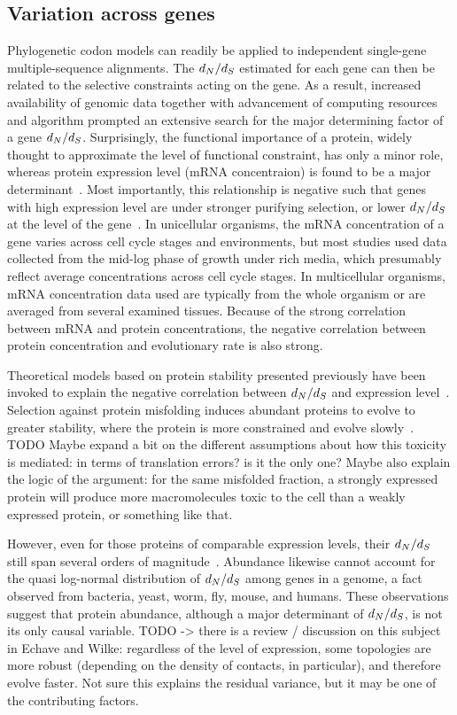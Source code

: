 \subsection{Variation across genes}

Phylogenetic codon models can readily be applied to independent single-gene multiple-sequence alignments.
The $d_N / d_S$ estimated for each gene can then be related to the selective constraints acting on the gene.
As a result, increased availability of genomic data together with advancement of computing resources and algorithm prompted an extensive search for the major determining factor of a gene $d_N / d_S$.
Surprisingly, the functional importance of a protein, widely thought to approximate the level of functional constraint, has only a minor role, whereas protein expression level (mRNA concentraion) is found to be a major determinant~\citep{Zhang2015}.
Most importantly, this relationship is negative such that genes with high expression level are under stronger purifying selection, or lower $d_N / d_S$ at the level of the gene~\citep{Duret2000, Drummond2005a, Zhang2015}.
In unicellular organisms, the mRNA concentration of a gene varies across cell cycle stages and environments, but most studies used data collected from the mid-log phase of growth under rich media, which presumably reflect average concentrations across cell cycle stages.
In multicellular organisms, mRNA concentration data used are typically from the whole organism or are averaged from several examined tissues.
Because of the strong correlation between mRNA and protein concentrations, the negative correlation between protein concentration and evolutionary rate is also strong.

Theoretical models based on protein stability presented previously have been invoked to explain the negative correlation between $d_N / d_S$ and expression level~\citep{Wilke2006, Drummond2008}.
Selection against protein misfolding induces abundant proteins to evolve to greater stability, where the protein is more constrained and evolve slowly~\citep{Serohijos2012}.
TODO
Maybe expand a bit on the different assumptions about how this toxicity is mediated:
in terms of translation errors? is it the only one?
Maybe also explain the logic of the argument: for the same misfolded fraction, a strongly expressed protein will produce more macromolecules toxic to the cell than a weakly expressed protein, or something like that.


However, even for those proteins of comparable expression levels, their $d_N / d_S$ still span several orders of magnitude~\citep{Drummond2008}.
Abundance likewise cannot account for the quasi log-normal distribution of $d_N / d_S$ among genes in a genome, a fact observed from bacteria, yeast, worm, fly, mouse, and humans.
These observations suggest that protein abundance, although a major determinant of $d_N / d_S$, is not its only causal variable.
TODO
-> there is a review / discussion on this subject in Echave and Wilke: regardless of the level of expression, some topologies are more robust (depending on the density of contacts, in particular), and therefore evolve faster. Not sure this explains the residual variance, but it may be one of the contributing factors.
